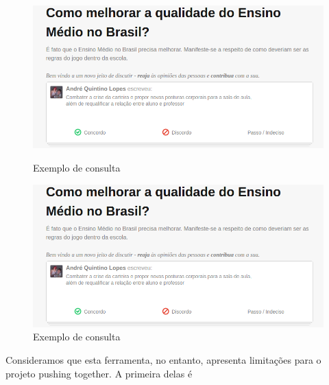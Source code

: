\documentclass{llncs}
\begin{document}
\begin{figure}[H]
  \centering
    \begin{minipage}{.5\textwidth}
      \includegraphics[keepaspectratio=true,scale=0.1]{images/polis1.png}
      \caption{Exemplo de consulta}
      \label{fig:polis-2}
    \end{minipage}
    \begin{minipage}{.5\textwidth}
      \includegraphics[keepaspectratio=true,scale=0.1]{images/polis1.png}
      \caption{Exemplo de consulta}
      \label{fig:polis-1}
    \end{minipage}
\end{figure}

 Consideramos que esta ferramenta, no entanto, apresenta limitações para o projeto
 pushing together. A primeira delas é 

\end{document}
